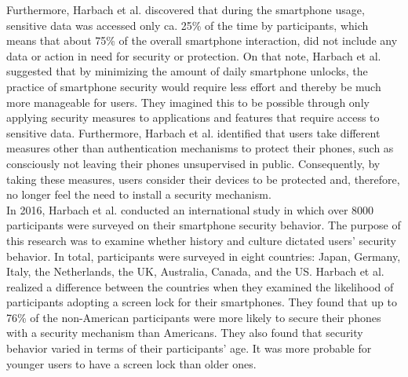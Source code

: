 Furthermore, Harbach et al. \cite{harbach} discovered that during the smartphone usage, sensitive data was accessed only ca. 25\% of the time by participants, which means that about 75\% of the overall smartphone interaction, did not include any data or action in need for security or protection. On that note, Harbach et al. \cite{harbach} suggested that by minimizing the amount of daily smartphone unlocks, the practice of smartphone security would require less effort and thereby be much more manageable for users. They imagined this to be possible through only applying security measures to applications and features that require access to sensitive data. Furthermore, Harbach et al. \cite{harbach} identified that users take different measures other than authentication mechanisms to protect their phones, such as consciously not leaving their phones unsupervised in public. Consequently, by taking these measures, users consider their devices to be protected and, therefore, no longer feel the need to install a security mechanism. \\

In 2016, Harbach et al. \cite{Harbach:2016} conducted an international study in which over 8000 participants were surveyed on their smartphone security behavior. The purpose of this research was to examine whether history and culture dictated users' security behavior. In total, participants were surveyed in eight countries: Japan, Germany, Italy, the Netherlands, the UK, Australia, Canada, and the US. Harbach et al. \cite{Harbach:2016} realized a difference between the countries when they examined the likelihood of participants adopting a screen lock for their smartphones. They found that up to 76\% of the non-American participants were more likely to secure their phones with a security mechanism than Americans. They also found that security behavior varied in terms of their participants' age. It was more probable for younger users to have a screen lock than older ones.\\

